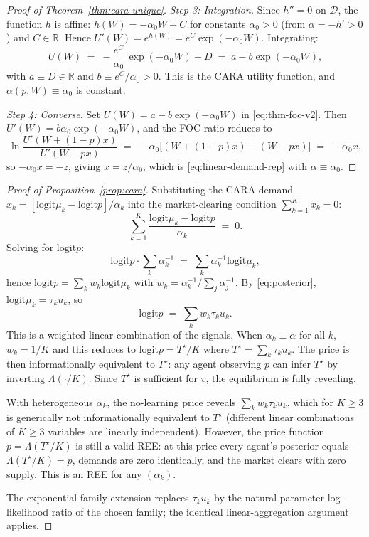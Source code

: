 \documentclass[12pt,letterpaper]{article}
\theoremstyle{definition}
\theoremstyle{remark}
\newcommand{\R}{\mathbb{R}}
\newcommand{\Lam}{\Lambda}            %
\newcommand{\logit}{\mathrm{logit}}
\newcommand{\Tstar}{T^{\!\star}}
\newcommand{\1}{\mathbf{1}}
\begin{document}
\begin{proof}[Proof of Theorem~\ref{thm:cara-unique}]
\emph{Step 3: Integration.} Since $h''=0$ on $\mathcal{D}$, the function
$h$ is affine: $h(W)=-\alpha_{0}W+C$ for constants $\alpha_{0}>0$ (from
$\alpha=-h'>0$) and $C\in\R$.
Hence $U'(W)=e^{h(W)}=e^{C}\exp(-\alpha_{0}W)$. Integrating:
\[
   U(W) \;=\; -\frac{e^{C}}{\alpha_{0}}\,\exp(-\alpha_{0}W) + D
   \;=\; a - b\exp(-\alpha_{0}W),
\]
with $a\equiv D\in\R$ and $b\equiv e^{C}/\alpha_{0}>0$. This is the CARA
utility function, and $\alpha(p,W)\equiv\alpha_{0}$ is constant.

\emph{Step 4: Converse.} Set $U(W)=a-b\exp(-\alpha_{0}W)$ in
\eqref{eq:thm-foc-v2}. Then
$U'(W)=b\alpha_{0}\exp(-\alpha_{0}W)$, and the FOC ratio reduces to
\[
   \ln\frac{U'(W+(1-p)x)}{U'(W-px)}
   \;=\; -\alpha_{0}\bigl[(W+(1-p)x)-(W-px)\bigr]
   \;=\; -\alpha_{0}x,
\]
so $-\alpha_{0}x = -z$, giving $x=z/\alpha_{0}$, which is
\eqref{eq:linear-demand-rep} with $\alpha\equiv\alpha_{0}$.
\end{proof}

\begin{proof}[Proof of Proposition~\ref{prop:cara}]
Substituting the CARA demand $x_{k}=[\logit\mu_{k}-\logit p]/\alpha_{k}$
into the market-clearing condition $\sum_{k=1}^{K}x_{k}=0$:
\[
   \sum_{k=1}^{K} \frac{\logit\mu_{k}-\logit p}{\alpha_{k}} \;=\; 0.
\]
Solving for $\logit p$:
\[
   \logit p \cdot \sum_{k}\alpha_{k}^{-1}
   \;=\; \sum_{k}\alpha_{k}^{-1}\logit\mu_{k},
\]
hence $\logit p=\sum_{k}w_{k}\logit\mu_{k}$ with
$w_{k}=\alpha_{k}^{-1}/\sum_{j}\alpha_{j}^{-1}$.
By \eqref{eq:posterior}, $\logit\mu_{k}=\tau_{k}u_{k}$, so
\[
   \logit p \;=\; \sum_{k}w_{k}\tau_{k}u_{k}.
\]
This is a weighted linear combination of the signals. When
$\alpha_{k}\equiv\alpha$ for all $k$, $w_{k}=1/K$ and this reduces to
$\logit p = \Tstar/K$ where $\Tstar=\sum_{k}\tau_{k}u_{k}$. The price is
then informationally equivalent to $\Tstar$: any agent observing $p$
can infer $\Tstar$ by inverting $\Lam(\cdot/K)$. Since $\Tstar$ is
sufficient for $v$, the equilibrium is fully revealing.

With heterogeneous $\alpha_{k}$, the no-learning price reveals
$\sum_{k}w_{k}\tau_{k}u_{k}$, which for $K\geq 3$ is generically not
informationally equivalent to $\Tstar$ (different linear combinations
of $K\geq 3$ variables are linearly independent). However, the price
function $p=\Lam(\Tstar/K)$ is still a valid REE: at this price every
agent's posterior equals $\Lam(\Tstar/K)=p$, demands are zero
identically, and the market clears with zero supply. This is an REE
for any $(\alpha_{k})$.

The exponential-family extension replaces $\tau_{k}u_{k}$ by the
natural-parameter log-likelihood ratio of the chosen family; the
identical linear-aggregation argument applies.
\end{proof}
\end{document}
